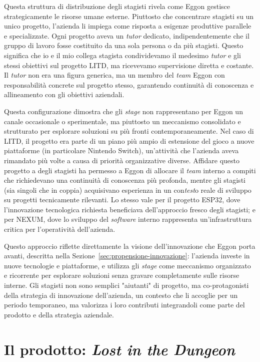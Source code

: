 Questa struttura di distribuzione degli stagisti rivela come Eggon gestisce strategicamente le risorse umane esterne. Piuttosto che concentrare stagisti su un unico progetto, l'azienda li impiega come risposta a esigenze produttive parallele e specializzate. Ogni progetto aveva un \textit{tutor} dedicato, indipendentemente che il gruppo di lavoro fosse costituito da una sola persona o da più stagisti. Questo significa che io e il mio collega stagista condividevamo il medesimo \textit{tutor} e gli stessi obiettivi sul progetto LITD, ma ricevevamo supervisione diretta e costante. Il \textit{tutor} non era una figura generica, ma un membro del \textit{team} Eggon con responsabilità concrete sul progetto stesso, garantendo continuità di conoscenza e allineamento con gli obiettivi aziendali.

Questa configurazione dimostra che gli \textit{stage} non rappresentano per Eggon un canale occasionale o sperimentale, ma piuttosto un meccanismo consolidato e strutturato per esplorare soluzioni su più fronti contemporaneamente. Nel caso di LITD, il progetto era parte di un piano più ampio di estensione del gioco a nuove piattaforme (in particolare Nintendo Switch), un'attività che l'azienda aveva rimandato più volte a causa di priorità organizzative diverse. Affidare questo progetto a degli stagisti ha permesso a Eggon di allocare il \textit{team} interno a compiti che richiedevano una continuità di conoscenza più profonda, mentre gli stagisti (sia singoli che in coppia) acquisivano esperienza in un con\textit{test}o reale di sviluppo su progetti tecnicamente rilevanti. Lo stesso vale per il progetto ESP32, dove l'innovazione tecnologica richiesta beneficiava dell'approccio fresco degli stagisti; e per NEXUM, dove lo sviluppo del \textit{software} interno rappresenta un'infrastruttura critica per l'operatività dell'azienda.

Questo approccio riflette direttamente la visione dell'innovazione che Eggon porta avanti, descritta nella Sezione~\ref{sec:propensione-innovazione}: l'azienda investe in nuove tecnologie e piattaforme, e utilizza gli \textit{stage} come meccanismo organizzato e ricorrente per esplorare soluzioni senza gravare completamente sulle risorse interne. Gli stagisti non sono semplici "aiutanti" di progetto, ma co-protagonisti della strategia di innovazione dell'azienda, un contesto che li accoglie per un periodo temporaneo, ma valorizza i loro contributi integrandoli come parte del prodotto e della strategia aziendale.

\section{Il prodotto: \textit{Lost in the Dungeon}}
\label{sec:prodotto-litd}

